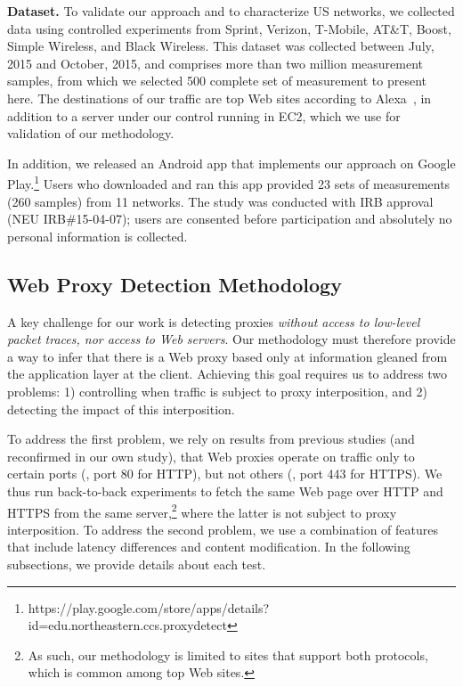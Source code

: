 \noindent\textbf{Dataset.} 
To validate our approach and to characterize US networks, we collected data using controlled experiments from 
Sprint, Verizon, T-Mobile, AT\&T, Boost, Simple Wireless, and Black Wireless.
This dataset was collected between July, 2015 and October, 2015, and comprises more than two million measurement 
samples, from which we selected 500 complete set of measurement to present here. 
The destinations of our traffic are top Web sites according to Alexa~\cite{topweb}, in addition to a server under our control 
running in EC2, which we use for validation of our methodology.

In addition, we released an Android app that implements our approach on Google Play.\footnote{{https://play.google.com/store/apps/details?id=edu.northeastern.ccs.proxydetect}}
Users who downloaded and ran this app provided 23 sets of measurements (260 samples) from 11 networks. 
The study was conducted with IRB approval (NEU IRB\#15-04-07); users are consented before participation and absolutely 
no personal information is collected.

\vspace{-1em}
\subsection{Web Proxy Detection Methodology}
A key challenge for our work is detecting proxies \emph{without access to low-level packet traces, nor access to Web servers}. 
Our methodology must therefore provide a way to infer that there is a Web proxy based only at information gleaned from 
the application layer at the client.  Achieving this goal requires us to address two problems: 1) controlling when traffic 
is subject to proxy interposition, and 2) detecting the impact of this interposition. 

To address the first problem, we rely on results from previous studies (and reconfirmed in our own study), that Web 
proxies operate on traffic only to certain ports (\eg, port 80 for HTTP), but not others (\eg, port 443 for HTTPS). We 
thus run back-to-back experiments to fetch the same Web page over HTTP and HTTPS from the same server,\footnote{As such, our methodology is limited to sites that support both protocols, which is common among top Web sites.} where the latter is not 
subject to proxy interposition. To address the second problem, we use a combination of features that include 
latency differences and content modification. In the following subsections, we provide details about each test.

